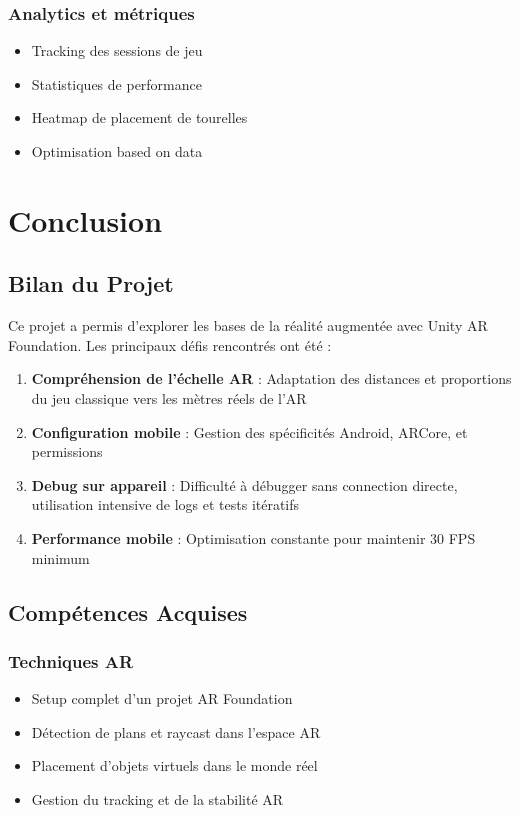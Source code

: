 \documentclass[12pt,a4paper]{article}
\begin{document}
\subsubsection{Analytics et métriques}
\begin{itemize}
    \item Tracking des sessions de jeu
    \item Statistiques de performance
    \item Heatmap de placement de tourelles
    \item Optimisation based on data
\end{itemize}

\section{Conclusion}

\subsection{Bilan du Projet}

Ce projet a permis d'explorer les bases de la réalité augmentée avec Unity AR Foundation. Les principaux défis rencontrés ont été :

\begin{enumerate}
    \item \textbf{Compréhension de l'échelle AR} : Adaptation des distances et proportions du jeu classique vers les mètres réels de l'AR
    \item \textbf{Configuration mobile} : Gestion des spécificités Android, ARCore, et permissions
    \item \textbf{Debug sur appareil} : Difficulté à débugger sans connection directe, utilisation intensive de logs et tests itératifs
    \item \textbf{Performance mobile} : Optimisation constante pour maintenir 30 FPS minimum
\end{enumerate}

\subsection{Compétences Acquises}

\subsubsection{Techniques AR}
\begin{itemize}[label=$\checkmark$]
    \item Setup complet d'un projet AR Foundation
    \item Détection de plans et raycast dans l'espace AR
    \item Placement d'objets virtuels dans le monde réel
    \item Gestion du tracking et de la stabilité AR
\end{itemize}
\end{document}
